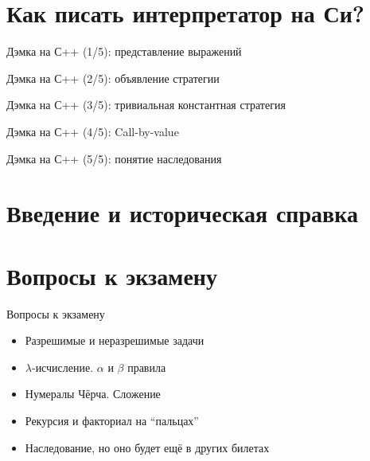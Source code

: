 \section{Как писать интерпретатор на Си?}
\begin{frame}{Дэмка на С++ (1/5): представление выражений}
\cast
\end{frame}

\begin{frame}{Дэмка на С++ (2/5): объявление стратегии}
\strat
\end{frame}

\begin{frame}{Дэмка на С++ (3/5): тривиальная константная стратегия}
\nostrat
\end{frame}

\begin{frame}{Дэмка на С++ (4/5): Call-by-value}
\cbvstrat
\end{frame}
\begin{frame}{Дэмка на С++ (5/5): понятие наследования}
\inheritance
\end{frame}



\section{Введение и историческая справка}


\section{Вопросы к экзамену}
\begin{frame}{Вопросы к экзамену}
\begin{itemize}
  \item Разрешимые и неразрешимые задачи
  \item $\lambda$-исчисление. $\alpha$ и $\beta$ правила
  \item Нумералы Чёрча. Сложение
  \item Рекурсия и факториал на ``пальцах''
  \item Наследование, но оно будет ещё в других билетах
\end{itemize}
\end{frame}
